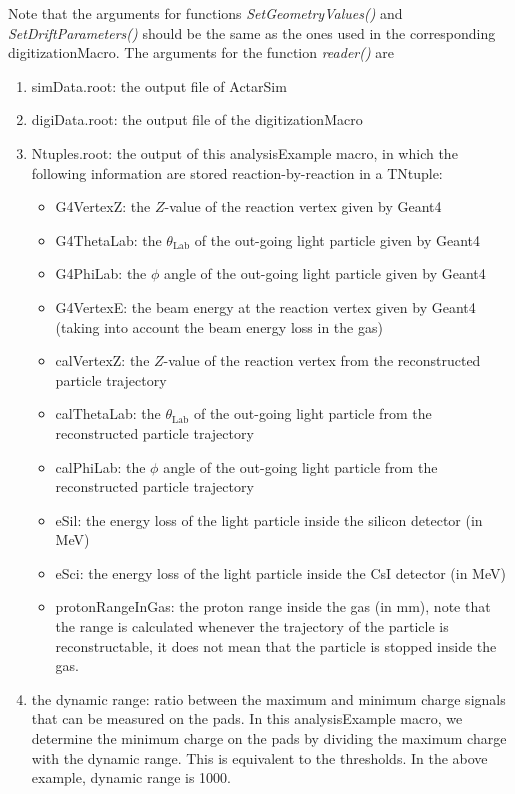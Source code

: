 Note that the arguments for functions \textit{SetGeometryValues()} and \textit{SetDriftParameters()} should be the same as the ones used in the corresponding digitizationMacro. The arguments for the function \textit{reader()} are
\begin{enumerate}
 \item simData.root: the output file of ActarSim
 \item digiData.root: the output file of the digitizationMacro
 \item Ntuples.root: the output of this analysisExample macro, in which the following information are stored reaction-by-reaction in a TNtuple:
 \begin{itemize}
  \item G4VertexZ: the $Z$-value of the reaction vertex given by Geant4
  \item G4ThetaLab: the $\theta_\text{Lab}$ of the out-going light particle given by Geant4
  \item G4PhiLab: the $\phi$ angle of the out-going light particle given by Geant4
  \item G4VertexE: the beam energy at the reaction vertex given by Geant4 (taking into account the beam energy loss in the gas)
  \item calVertexZ: the $Z$-value of the reaction vertex from the reconstructed particle trajectory
  \item calThetaLab: the $\theta_\text{Lab}$ of the out-going light particle from the reconstructed particle trajectory
  \item calPhiLab: the $\phi$ angle of the out-going light particle from the reconstructed particle trajectory
  \item eSil: the energy loss of the light particle inside the silicon detector (in MeV)
  \item eSci: the energy loss of the light particle inside the CsI detector (in MeV)
  \item protonRangeInGas: the proton range inside the gas (in mm), note that the range is calculated whenever the trajectory of the particle is reconstructable, it does not mean that the particle is stopped inside the gas.
 \end{itemize}

 \item the dynamic range: ratio between the maximum and minimum charge signals that can be measured on the pads. In this analysisExample macro, we determine the minimum charge on the pads by dividing the maximum charge with the dynamic range. This is equivalent to the thresholds. In the above example, dynamic range is 1000.


\end{enumerate}
